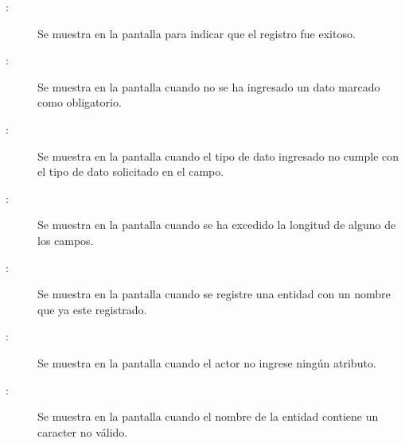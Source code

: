 	
\begin{description}
	\item[:] Se muestra en la pantalla  para indicar que el registro fue exitoso.
	\item[:] Se muestra en la pantalla  cuando no se ha ingresado un dato marcado como obligatorio.
	\item[:] Se muestra en la pantalla  cuando el tipo de dato ingresado no cumple con el tipo de dato solicitado en el campo.
	\item[:] Se muestra en la pantalla  cuando se ha excedido la longitud de alguno de los campos.
	\item[:] Se muestra en la pantalla  cuando se registre una entidad con un nombre que ya este registrado.
	\item[:] Se muestra en la pantalla  cuando el actor no ingrese ningún atributo.
	\item[:] Se muestra en la pantalla  cuando el nombre de la entidad contiene un caracter no válido.
\end{description}
